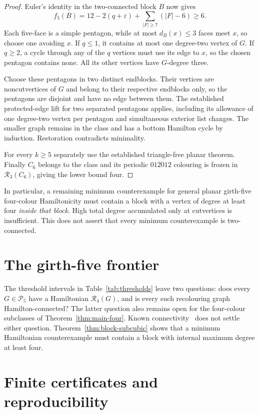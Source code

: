 \documentclass[11pt]{article}
\theoremstyle{remark}
\newcommand{\R}{\mathcal R}
\numberwithin{equation}{section}
\numberwithin{table}{section}
\begin{document}
\begin{proof}
Euler's identity in the two-connected block $B$ now gives
\[
 f_5(B)=12-2(q+\varepsilon)+\sum_{|F|\ge7}(|F|-6)\ge6.
\]
Each five-face is a simple pentagon, while at most $d_B(x)\le3$
faces meet $x$, so choose one avoiding $x$. If $q\le1$, it contains
at most one degree-two vertex of $G$. If $q\ge2$, a cycle through
any of the $q$ vertices must use its edge to $x$, so the chosen
pentagon contains none. All its other vertices have $G$-degree three.

Choose these pentagons in two distinct endblocks. Their vertices
are noncutvertices of $G$ and belong to their respective endblocks
only, so the pentagons are disjoint and have no edge between them.
The established protected-edge lift for two separated pentagons
applies, including its allowance of one degree-two vertex per
pentagon and simultaneous exterior list changes. The smaller graph
remains in the class and has a bottom Hamilton cycle by induction.
Restoration contradicts minimality.

For every $k\ge5$ separately use the established triangle-free
planar theorem. Finally $C_6$ belongs to the class and its periodic
$012012$ colouring is frozen in $\R_3(C_6)$, giving the lower bound
four.
\end{proof}
In particular, a remaining minimum counterexample for general
planar girth-five four-colour Hamiltonicity must contain a block
with a vertex of degree at least four \emph{inside that block}.
High total degree accumulated only at cutvertices is insufficient.
This does not assert that every minimum counterexample is two-connected.

\section{The girth-five frontier}\label{sec:sharpness}

The threshold intervals in Table~\ref{tab:thresholds} leave two
questions: does every $G\in\mathcal P_5$ have a Hamiltonian
$\R_4(G)$, and is every such recolouring graph Hamilton-connected?
The latter question also remains open for the four-colour subclasses
of Theorem~\ref{thm:main-four}. Known connectivity~\cite{BBFHMP23}
does not settle either question. Theorem~\ref{thm:block-subcubic}
shows that a minimum Hamiltonian counterexample must contain a block
with internal maximum degree at least four.

\section{Finite certificates and reproducibility}
\label{sec:verification}
\end{document}
